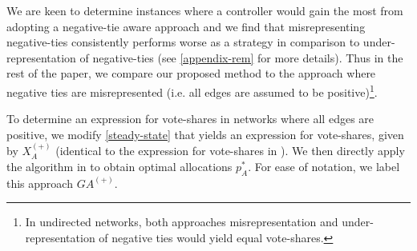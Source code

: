 We are keen to determine instances where a controller would gain the most from adopting a negative-tie aware approach and we find that misrepresenting negative-ties consistently performs worse as a strategy in comparison to under-representation of negative-ties (see \cref{appendix-rem} for more details). Thus in the rest of the paper, we compare our proposed method to the approach where negative ties are misrepresented (i.e. all edges are assumed to be positive)\footnote{In undirected networks, both approaches \textemdash misrepresentation and under-representation of negative ties \textemdash would yield equal vote-shares.}.

To determine an expression for vote-shares in networks where all edges are positive, we modify \cref{steady-state} that yields an expression for vote-shares, given by $X_{A}^{(+)}$ (identical to the expression for vote-shares in \cite{romero2021shadowing}). We then directly apply the algorithm in \cite{romero2021shadowing} to obtain optimal allocations $p_{A}^*$. For ease of notation, we label this approach $GA^{(+)}$.



